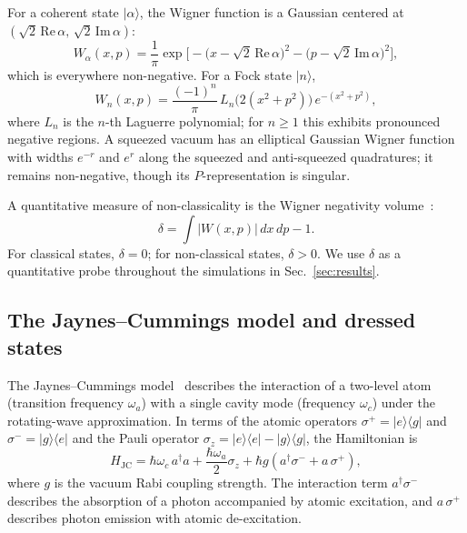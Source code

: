 \documentclass[%
 reprint,
 amsmath,amssymb,
 aps,
]{revtex4-2}
\begin{document}
For a coherent state $|\alpha\rangle$, the Wigner function is a Gaussian centered at $(\sqrt{2}\,\text{Re}\,\alpha,\, \sqrt{2}\,\text{Im}\,\alpha)$:
\begin{equation}
W_\alpha(x,p) = \frac{1}{\pi} \exp\!\Big[-\big(x - \sqrt{2}\,\text{Re}\,\alpha\big)^2 - \big(p - \sqrt{2}\,\text{Im}\,\alpha\big)^2\Big],
\label{eq:wigner_coherent}
\end{equation}
which is everywhere non-negative. For a Fock state $|n\rangle$,
\begin{equation}
W_n(x,p) = \frac{(-1)^n}{\pi} \, L_n\!\big(2(x^2 + p^2)\big) \, e^{-(x^2 + p^2)},
\label{eq:wigner_fock}
\end{equation}
where $L_n$ is the $n$-th Laguerre polynomial; for $n \geq 1$ this exhibits pronounced negative regions. A squeezed vacuum has an elliptical Gaussian Wigner function with widths $e^{-r}$ and $e^{r}$ along the squeezed and anti-squeezed quadratures; it remains non-negative, though its $P$-representation is singular.

A quantitative measure of non-classicality is the Wigner negativity volume~\cite{kenfack2004}:
\begin{equation}
\delta = \int \big|W(x,p)\big| \, dx\, dp - 1.
\label{eq:negativity}
\end{equation}
For classical states, $\delta = 0$; for non-classical states, $\delta > 0$. We use $\delta$ as a quantitative probe throughout the simulations in Sec.~\ref{sec:results}.


\subsection{The Jaynes--Cummings model and dressed states}
\label{sec:jcm}

The Jaynes--Cummings model~\cite{jaynes1963} describes the interaction of a two-level atom (transition frequency $\omega_a$) with a single cavity mode (frequency $\omega_c$) under the rotating-wave approximation. In terms of the atomic operators $\sigma^+ = |e\rangle\langle g|$ and $\sigma^- = |g\rangle\langle e|$ and the Pauli operator $\sigma_z = |e\rangle\langle e| - |g\rangle\langle g|$, the Hamiltonian is
\begin{equation}
H_{\text{JC}} = \hbar\omega_c\, a^\dagger a + \frac{\hbar\omega_a}{2}\sigma_z + \hbar g\left(a^\dagger \sigma^- + a\,\sigma^+\right),
\label{eq:HJC}
\end{equation}
where $g$ is the vacuum Rabi coupling strength. The interaction term $a^\dagger \sigma^-$ describes the absorption of a photon accompanied by atomic excitation, and $a\,\sigma^+$ describes photon emission with atomic de-excitation.
\end{document}
